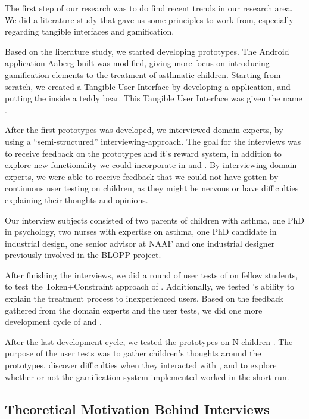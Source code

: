 The first step of our research was to do find recent trends in our research area. We did a literature study that gave us some principles to work from, especially regarding tangible interfaces and gamification. 
 
Based on the literature study, we started developing prototypes. The Android application Aaberg \etal{} built was modified, giving \app{} more focus on introducing gamification elements to the treatment of asthmatic children. Starting from scratch, we created a Tangible User Interface by developing a \rpi{} application, and putting the \rpi{} inside a teddy bear. This Tangible User Interface was given the name \ab{}.       

After the first prototypes was developed, we interviewed domain experts, by using a ``semi-structured'' interviewing-approach. The goal for the interviews was to receive feedback on the prototypes and it's reward system, in addition to explore new functionality we could incorporate in \ab{} and \app{}. By interviewing domain experts, we were able to receive feedback that we could not have gotten by continuous user testing on children, as they might be nervous or have difficulties explaining their thoughts and opinions.  

Our interview subjects consisted of two parents of children with asthma, one PhD in psychology, two nurses with expertise on asthma, one PhD candidate in industrial design, one senior advisor at NAAF and one industrial designer previously involved in the BLOPP project. 

After finishing the interviews, we did a round of user tests of \ab{} on fellow students, to test the Token+Constraint approach of \ab{}. Additionally, we tested \ab{}'s ability to explain the treatment process to inexperienced users. Based on the feedback gathered from the domain experts and the user tests, we did one more development cycle of \ab{} and \app{}.

After the last development cycle, we tested the prototypes on N children \iref{}. The purpose of the user tests was to gather children's thoughts around the prototypes, discover difficulties when they interacted with \ab{}, and to explore whether or not the gamification system implemented worked in the short run.  



\subsection{Theoretical Motivation Behind Interviews}


